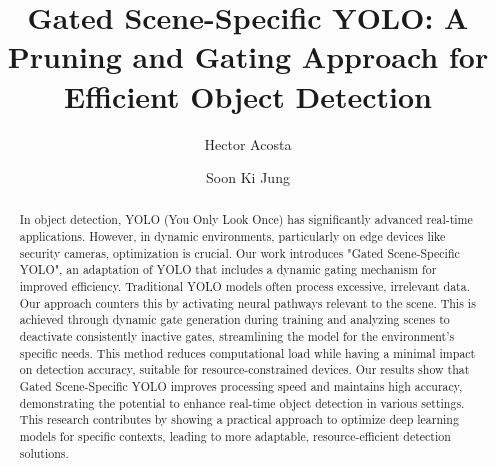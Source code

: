 \documentclass[runningheads]{llncs}
\begin{document}
\title{Gated Scene-Specific YOLO: A Pruning and Gating Approach for Efficient Object Detection}
%
\author{Hector Acosta \and
Soon Ki Jung}
%
%
\maketitle              %
%
\begin{abstract}
In object detection, YOLO (You Only Look Once) has significantly advanced real-time applications. However, in dynamic environments, particularly on edge devices like security cameras, optimization is crucial. Our work introduces "Gated Scene-Specific YOLO", an adaptation of YOLO that includes a dynamic gating mechanism for improved efficiency. Traditional YOLO models often process excessive, irrelevant data. Our approach counters this by activating neural pathways relevant to the scene. This is achieved through dynamic gate generation during training and analyzing scenes to deactivate consistently inactive gates, streamlining the model for the environment's specific needs. This method reduces computational load while having a minimal impact on detection accuracy, suitable for resource-constrained devices. Our results show that Gated Scene-Specific YOLO improves processing speed and maintains high accuracy, demonstrating the potential to enhance real-time object detection in various settings. This research contributes by showing a practical approach to optimize deep learning models for specific contexts, leading to more adaptable, resource-efficient detection solutions.
%
\end{abstract}
%
\end{document}
